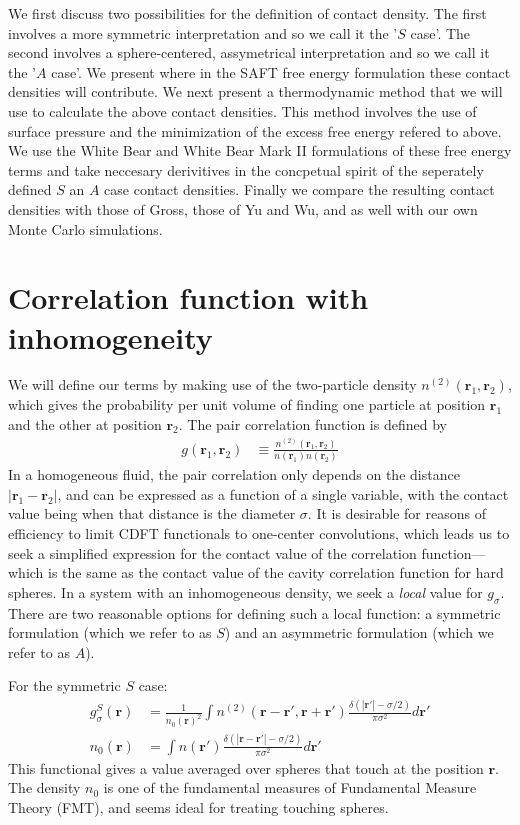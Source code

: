 \documentclass[letterpaper,twocolumn,amsmath,amssymb,jcp,10pt,aip]{revtex4-1}
\newcommand{\rr}{\textbf{r}}
\begin{document}
We first discuss two possibilities for the definition of contact
density.  The first involves a more symmetric interpretation and so we
call it the '$S$ case'.  The second involves a sphere-centered,
assymetrical interpretation and so we call it the '$A$ case'.  We
present where in the SAFT free energy formulation these contact
densities will contribute.  We next present a thermodynamic method
that we will use to calculate the above contact densities.  This
method involves the use of surface pressure and the minimization of
the excess free energy refered to above.  We use the White Bear and
White Bear Mark II formulations of these free energy terms and take
neccesary derivitives in the concpetual spirit of the seperately
defined $S$ an $A$ case contact densities.  Finally we compare the
resulting contact densities with those of Gross, those of Yu and Wu,
and as well with our own Monte Carlo simulations.


\section{Correlation function with inhomogeneity}

We will define our terms by making use of the two-particle density
$n^{(2)}(\rr_1,\rr_2)$, which gives the probability per unit volume of
finding one particle at position $\rr_1$ and the other at position
$\rr_2$.  The pair correlation function is defined by
\begin{align}
  g(\rr_1,\rr_2) &\equiv \frac{n^{(2)}(\rr_1,\rr_2)}{n(\rr_1)n(\rr_2)}
\end{align}
In a homogeneous fluid, the pair correlation only depends on the
distance $|\rr_1-\rr_2|$, and can be expressed as a function of a
single variable, with the contact value being when that distance is
the diameter $\sigma$.  It is desirable for reasons of efficiency to limit CDFT
functionals to one-center convolutions, which leads us to seek a
simplified expression for the contact value of the correlation
function---which is the same as the contact value of the cavity
correlation function for hard spheres.
In a system with an inhomogeneous density, we seek a \emph{local}
value for $g_\sigma$.  There are two reasonable options for defining
such a local function: a symmetric formulation (which we refer to as $S$) and an
asymmetric formulation (which we refer to as $A$).

For the symmetric $S$ case:
\begin{align}
  g^S_\sigma(\rr) &= \frac{1}{n_0(\rr)^2}\int n^{(2)}(\rr - \rr', \rr
  + \rr')
  \frac{\delta(|\rr'| -\sigma/2)}{\pi\sigma^2}d\rr' \\
  n_0(\rr) &= \int n(\rr')\frac{\delta(|\rr-\rr'|-\sigma/2)}{\pi\sigma^2} d\rr'
\end{align}
This functional gives a value averaged over spheres that touch at the
position $\rr$.  The density $n_0$ is one of the fundamental measures
of Fundamental Measure Theory (FMT), and seems ideal for treating
touching spheres.
\end{document}
